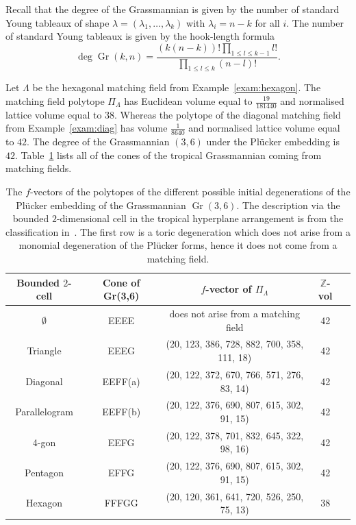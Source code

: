 \documentclass[ALCO,ThmDefs,Unicode,epreuves]{cedram}
\DeclareMathOperator{\Gr}{Gr}
\begin{document}
Recall that the degree of the Grassmannian is given by the number of standard Young tableaux of shape $\lambda = (\lambda_1, \ldots, \lambda_k)$ with $\lambda_i = n-k$ for all $i$. The number of standard Young tableaux is given by the hook-length formula 
\[
 \deg \Gr(k, n) =\frac{{({k}(n -{k}))!} \prod_{1 \le l \le {k}-1} l ! }{\prod_{1 \le l \le {k}} (n - l )! }.
\]
\begin{exam}
Let $\Lambda$ be the hexagonal matching field from Example~\ref{exam:hexagon}. 
The matching field polytope $\Pi_{\Lambda}$ has Euclidean volume equal to $\frac{19}{181440}$ and normalised lattice volume equal to $38$. Whereas the polytope of the diagonal matching field from Example~\ref{exam:diag} has volume $\frac{1}{8640}$ and normalised lattice volume equal to $42$. 
The degree of the Grassmannian $(3, 6)$ under the Pl{\"u}cker embedding is $42$. 
Table~\ref{fig:tableofpolytopes} 
lists all of the cones of the tropical Grassmannian coming from matching fields. 

\begin{table}[htb]\centering
\renewcommand{\tabcolsep}{3pt}
\renewcommand{\arraystretch}{1.2}
 \begin{tabular}{|c ||c c c c |} 
 \hline
Bounded $2$-cell & Cone of Gr(3,6) & $f$-vector of $\Pi_ \Lambda$ & $\mathbb{Z}$-vol &%
\\ [0.5ex] 
 \hline\hline
$\emptyset$ & EEEE& {does not arise from a matching field} & 42 & %
\\ 
\hline
 Triangle & EEEG & (20, 123, 386, 728, 882, 700, 358, 111, 18) & 42 & %
 \\ 
 \hline
Diagonal & EEFF(a) & (20, 122, 372, 670, 766, 571, 276, 83, 14) & 42 &%
\\
 \hline
 Parallelogram & EEFF(b) & (20, 122, 376, 690, 807, 615, 302, 91, 15) & 42 & %
\\ 
\hline 
4-gon &EEFG & (20, 122, 378, 701, 832, 645, 322, 98, 16) & 42 & %
 \\ 
 \hline
Pentagon & EFFG &(20, 122, 376, 690, 807, 615, 302, 91, 15) & 42 &%
 \\
 \hline
Hexagon & FFFGG &
(20, 120, 361, 641, 720, 526, 250, 75, 13) & 38 &%
 \\
 \hline
\end{tabular}

\vspace*{3mm}
\caption{The $f$-vectors of the polytopes of the different possible initial degenerations of the Pl{\"u}cker embedding of the Grassmannian $\Gr(3, 6)$. The description via the bounded $2$-dimensional cell in the tropical hyperplane arrangement is from the classification in~\cite{herrmann2009draw}. The first row is a toric degeneration which does not arise from a monomial degeneration of the Pl{\"u}cker forms, hence it does not come from a matching field. } \label{fig:tableofpolytopes} 
\end{table}
\end{exam}
\end{document}
